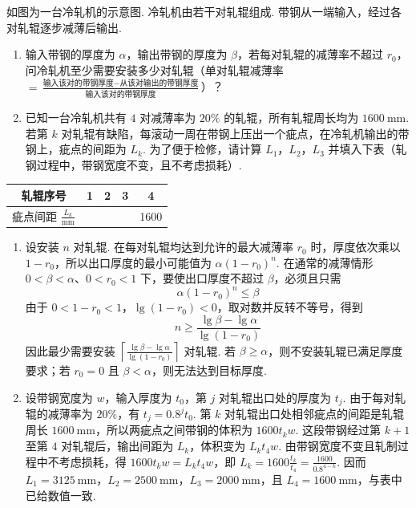 \documentclass[UTF8,a4paper,oneside,11pt]{ctexbook}
\begin{document}
\begin{problem}
如图为一台冷轧机的示意图. 冷轧机由若干对轧辊组成. 带钢从一端输入，经过各对轧辊逐步减薄后输出.

\begin{enumerate}
\item 输入带钢的厚度为 \(\alpha\)，输出带钢的厚度为 \(\beta\)，若每对轧辊的减薄率不超过 \(r_0\)，问冷轧机至少需要安装多少对轧辊（单对轧辊减薄率 \(=\frac{\text{输入该对的带钢厚度}-\text{从该对输出的带钢厚度}}{\text{输入该对的带钢厚度}}\)）？
\item 已知一台冷轧机共有 \(4\) 对减薄率为 \(20\%\) 的轧辊，所有轧辊周长均为 \(1600 \mathrm{~mm}\). 若第 \(k\) 对轧辊有缺陷，每滚动一周在带钢上压出一个疵点，在冷轧机输出的带钢上，疵点的间距为 \(L_k\). 为了便于检修，请计算 \(L_1\)，\(L_2\)，\(L_3\) 并填入下表（轧钢过程中，带钢宽度不变，且不考虑损耗）.
\end{enumerate}

\begin{center}
\begin{tabular}{|c|c|c|c|c|}
\hline
轧辊序号 & 1 & 2 & 3 & 4 \\
\hline
疵点间距 \(\frac{L_k}{\mathrm{mm}}\) &  &  &  & 1600 \\
\hline
\end{tabular}
\end{center}

\end{problem}

\begin{solution}
\begin{enumerate}
\item 设安装 \(n\) 对轧辊. 在每对轧辊均达到允许的最大减薄率 \(r_0\) 时，厚度依次乘以 \(1-r_0\)，所以出口厚度的最小可能值为 \(\alpha(1-r_0)^n\). 在通常的减薄情形 \(0<\beta<\alpha\)、\(0<r_0<1\) 下，要使出口厚度不超过 \(\beta\)，必须且只需
\[
\alpha(1-r_0)^n\leqslant\beta
\]
由于 \(0<1-r_0<1\)，\(\lg(1-r_0)<0\)，取对数并反转不等号，得到
\[
n\geqslant\frac{\lg\beta-\lg\alpha}{\lg(1-r_0)}
\]
因此最少需要安装 \(\left\lceil\frac{\lg\beta-\lg\alpha}{\lg(1-r_0)}\right\rceil\) 对轧辊. 若 \(\beta\geqslant\alpha\)，则不安装轧辊已满足厚度要求；若 \(r_0=0\) 且 \(\beta<\alpha\)，则无法达到目标厚度.
\item 设带钢宽度为 \(w\)，输入厚度为 \(t_0\)，第 \(j\) 对轧辊出口处的厚度为 \(t_j\). 由于每对轧辊的减薄率为 \(20\%\)，有 \(t_j=0.8^j t_0\). 第 \(k\) 对轧辊出口处相邻疵点的间距是轧辊周长 \(1600\mathrm{~mm}\)，所以两疵点之间带钢的体积为 \(1600t_kw\). 这段带钢经过第 \(k+1\) 至第 \(4\) 对轧辊后，输出间距为 \(L_k\)，体积变为 \(L_kt_4w\). 由带钢宽度不变且轧制过程中不考虑损耗，得 \(1600t_kw=L_kt_4w\)，即 \(L_k=1600\frac{t_k}{t_4}=\frac{1600}{0.8^{4-k}}\). 因而 \(L_1=3125\mathrm{~mm}\)，\(L_2=2500\mathrm{~mm}\)，\(L_3=2000\mathrm{~mm}\)，且 \(L_4=1600\mathrm{~mm}\)，与表中已给数值一致.
\end{enumerate}
\end{solution}
\end{document}
